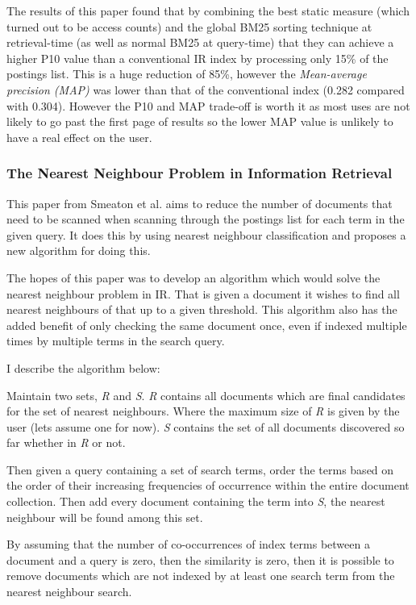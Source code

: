 \documentclass{acm_proc_article-sp}
\begin{document}
The results of this paper found that by combining the best static measure (which turned out to be access counts) and the global BM25 sorting technique at retrieval-time (as well as normal BM25 at query-time) that they can achieve a higher P10 value than a conventional IR index by processing only 15\% of the postings list. This is a huge reduction of 85\%, however the \emph{Mean-average precision (MAP)} was lower than that of the conventional index (0.282 compared with 0.304). However the P10 and MAP trade-off is worth it as most uses are not likely to go past the first page of results so the lower MAP value is unlikely to have a real effect on the user.

\subsubsection{The Nearest Neighbour Problem in Information Retrieval}

This paper from Smeaton et al. \cite{Smeaton:1981} aims to reduce the number of documents that need to be scanned when scanning through the postings list for each term in the given query. It does this by using nearest neighbour classification and proposes a new algorithm for doing this.

The hopes of this paper was to develop an algorithm which would solve the nearest neighbour problem in IR. That is given a document it wishes to find all nearest neighbours of that up to a given threshold. This algorithm also has the added benefit of only checking the same document once, even if indexed multiple times by multiple terms in the search query.

I describe the algorithm below:

Maintain two sets, \emph{R} and \emph{S}. \emph{R} contains all documents which are final candidates for the set of nearest neighbours. Where the maximum size of \emph{R} is given by the user (lets assume one for now). \emph{S} contains the set of all documents discovered so far whether in \emph{R} or not.

Then given a query containing a set of search terms, order the terms based on the order of their increasing frequencies of occurrence within the entire document collection. Then add every document containing the term into \emph{S}, the nearest neighbour will be found among this set.

By assuming that the number of co-occurrences of index terms between a document and a query is zero, then the similarity is zero, then it is possible to remove documents which are not indexed by at least one search term from the nearest neighbour search.
\end{document}
